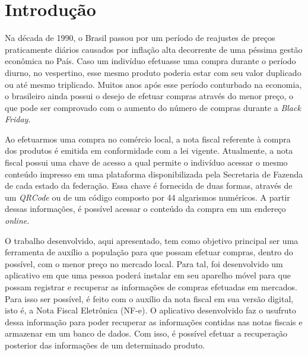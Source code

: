 \chapter{Introdução}


Na década de 1990, o Brasil passou por um período de reajustes de preços praticamente diários causados por inflação alta decorrente de uma péssima gestão econômica no País. Caso um indivíduo efetuasse uma compra durante o período diurno, no vespertino, esse mesmo produto poderia estar com seu valor duplicado ou até mesmo triplicado. Muitos anos após esse período conturbado na economia, o brasileiro ainda possui o desejo de efetuar compras através do menor preço, o que pode ser comprovado com o aumento do número de compras durante a \textit{Black Friday}.

Ao efetuarmos uma compra no comércio local, a nota fiscal referente à compra dos produtos é emitida em conformidade com a lei vigente. Atualmente, a nota fiscal possui uma chave de acesso a qual permite o indivíduo acessar o mesmo conteúdo impresso em uma plataforma disponibilizada pela Secretaria de Fazenda de cada estado da federação. Essa chave é fornecida de duas formas, através de um \textit{QRCode} ou de um código composto por 44 algarismos numéricos. A partir dessas informações, é possível acessar o conteúdo da compra em um endereço \textit{online}.


O trabalho desenvolvido, aqui apresentado, tem como objetivo principal ser uma ferramenta de auxílio a população para que possam efetuar compras, dentro do possível, com o menor preço no mercado local. Para tal, foi desenvolvido um aplicativo em que uma pessoa poderá instalar em seu aparelho móvel para que possam registrar e recuperar as informações de compras efetuadas em mercados. Para isso ser possível, é feito com o auxílio da nota fiscal em sua versão digital, isto é, a Nota Fiscal Eletrônica (NF-e). O aplicativo desenvolvido faz o usufruto dessa informação para poder recuperar as informações contidas nas notas fiscais e armazenar em um banco de dados. Com isso, é possível efetuar a recuperação posterior das informações de um determinado produto.

